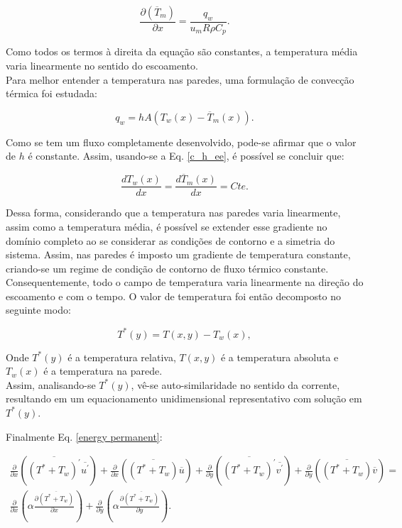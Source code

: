 \begin{equation}\label{c_h_ee}
\frac{\partial{\left(\overline{T}_m\right)}}{\partial{x}} = \frac{q_w}{u_m R \rho C_p}.
\end{equation}

Como todos os termos à direita da equação são constantes, a temperatura média varia linearmente no sentido do escoamento.\\
Para melhor entender a temperatura nas paredes, uma formulação de convecção térmica foi estudada:

\begin{equation}
q_w = h A \left( T_w(x) - \overline{T}_m(x)\right).
\end{equation}

Como se tem um fluxo completamente desenvolvido, pode-se afirmar que o valor de $h$ é constante. Assim, usando-se a Eq. \ref{c_h_ee}, é possível se concluir que:

\begin{equation}
\frac{d T_w(x)}{d x} = \frac{d \overline{T}_m(x)}{d x} = Cte.
\end{equation}	

Dessa forma, considerando que a temperatura nas paredes varia linearmente, assim como a temperatura média, é possível se extender esse gradiente no domínio completo ao se considerar as condições de contorno e a simetria do sistema. Assim, nas paredes é imposto um gradiente de temperatura constante, criando-se um regime de condição de contorno de fluxo térmico constante. Consequentemente, todo o campo de temperatura varia linearmente na direção do escoamento e com o tempo.
O valor de temperatura foi então decomposto no seguinte modo:

\begin{equation}
   T^\ast(y) = T(x,y) - T_w(x),
\end{equation}


 Onde $T^\ast(y)$ é a temperatura relativa, $T(x,y)$ é a temperatura absoluta e $T_w(x)$ é a temperatura na parede.\\

 Assim, analisando-se $T^\ast(y)$, vê-se auto-similaridade no sentido da corrente, resultando em um equacionamento unidimensional representativo com solução em $T^\ast(y)$.

 Finalmente Eq. \ref{energy permanent}:

\begin{equation}
\begin{split}
\frac{\partial{}}{\partial{x}} \left(\overline{(T^\ast + T_w)^\prime} \overline{ u^\prime}\right) + \frac{\partial{}}{\partial{x}}\left(\overline{(T^\ast + T_w)} \overline{u}\right)+ 
\frac{\partial{}}{\partial{y}} \left(\overline{(T^\ast + T_w)^\prime} \overline{ v^\prime}\right) + \frac{\partial{}}{\partial{y}}\left(\overline{(T^\ast + T_w)} \overline{v}\right) = \\
{\frac{\partial{}}{\partial{x}}} \left(\alpha {\frac{\partial{\overline{(T^\ast + T_w)}}}{\partial{x}}} \right) +
{\frac{\partial{}}{\partial{y}}} \left(\alpha {\frac{\partial{\overline{(T^\ast + T_w)}}}{\partial{y}}} \right). 
\end{split}
\end{equation}

